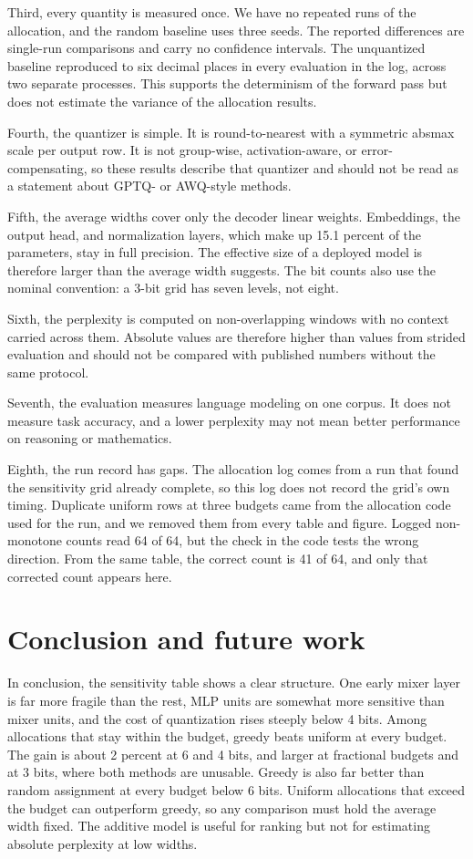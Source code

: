 \documentclass[11pt]{article}
\begin{document}
Third, every quantity is measured once. We have no repeated runs of the allocation, and the random baseline uses three seeds. The reported differences are single-run comparisons and carry no confidence intervals. The unquantized baseline reproduced to six decimal places in every evaluation in the log, across two separate processes. This supports the determinism of the forward pass but does not estimate the variance of the allocation results.

Fourth, the quantizer is simple. It is round-to-nearest with a symmetric absmax scale per output row. It is not group-wise, activation-aware, or error-compensating, so these results describe that quantizer and should not be read as a statement about GPTQ- or AWQ-style methods.

Fifth, the average widths cover only the decoder linear weights. Embeddings, the output head, and normalization layers, which make up 15.1 percent of the parameters, stay in full precision. The effective size of a deployed model is therefore larger than the average width suggests. The bit counts also use the nominal convention: a 3-bit grid has seven levels, not eight.

Sixth, the perplexity is computed on non-overlapping windows with no context carried across them. Absolute values are therefore higher than values from strided evaluation and should not be compared with published numbers without the same protocol.

Seventh, the evaluation measures language modeling on one corpus. It does not measure task accuracy, and a lower perplexity may not mean better performance on reasoning or mathematics.

Eighth, the run record has gaps. The allocation log comes from a run that found the sensitivity grid already complete, so this log does not record the grid's own timing. Duplicate uniform rows at three budgets came from the allocation code used for the run, and we removed them from every table and figure. Logged non-monotone counts read 64 of 64, but the check in the code tests the wrong direction. From the same table, the correct count is 41 of 64, and only that corrected count appears here.

\section{Conclusion and future work}

In conclusion, the sensitivity table shows a clear structure. One early mixer layer is far more fragile than the rest, MLP units are somewhat more sensitive than mixer units, and the cost of quantization rises steeply below 4 bits. Among allocations that stay within the budget, greedy beats uniform at every budget. The gain is about 2 percent at 6 and 4 bits, and larger at fractional budgets and at 3 bits, where both methods are unusable. Greedy is also far better than random assignment at every budget below 6 bits. Uniform allocations that exceed the budget can outperform greedy, so any comparison must hold the average width fixed. The additive model is useful for ranking but not for estimating absolute perplexity at low widths.
\end{document}
